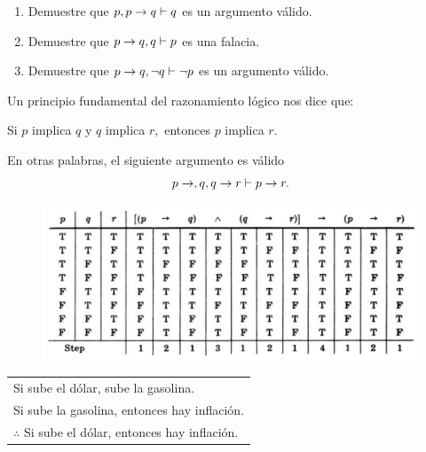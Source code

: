  \begin{exmp}
 \label{lip:exmp:4.4}
  \begin{enumerate}
   \item Demuestre que $p, p\rightarrow q \vdash q$ es un argumento v\'alido. 
   \item Demuestre que $p\rightarrow q, q \vdash p$ es una falacia.
   
   \item Demuestre que $p\rightarrow q, \neg q \vdash \neg p$ es un argumento v\'alido.
  \end{enumerate}

 \end{exmp}




 \begin{exmp}
  Un principio fundamental del razonamiento l\'ogico nos dice que:
  \begin{center}
   Si $p$ implica $q$ y $q$ implica $r,$ entonces $p$ implica $r.$ 
  \end{center}


En otras palabras, el siguiente argumento es v\'alido
$$
p\rightarrow,q, q\rightarrow r \vdash p \rightarrow r.
$$ 
 \end{exmp}

\begin{figure}
	\centering
	\includegraphics[width=0.7\linewidth]{md/tabla_silogismo}
	\caption{}
	\label{fig:tabla_silogismo}
\end{figure}


\begin{exmp}
  \begin{center}
\begin{tabular}{l}
Si sube el d\'olar, sube la gasolina.\\
Si sube la gasolina, entonces hay inflaci\'on.\\\hline
$\therefore$ Si sube el d\'olar, entonces hay inflaci\'on.
 \end{tabular}
 \end{center}
\end{exmp}


